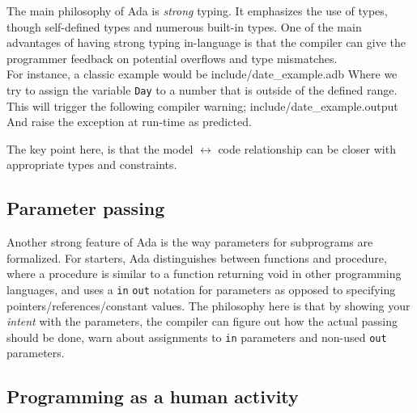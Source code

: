 \documentclass[10pt,a4paper]{article}
\newcommand{\code}[1]{\texttt{#1}}
\begin{document}
The main philosophy of Ada is \emph{strong} typing. It emphasizes the use of types, though self-defined types and numerous built-in types. One of the main advantages of having strong typing in-language is that the compiler can give the programmer feedback on potential overflows and type mismatches.\\

For instance, a classic example would be
 {include/date_example.adb}
Where we try to assign the variable \code{Day} to a number that is outside of the defined range. This will trigger the following compiler warning;
 {include/date_example.output}
And raise the exception at run-time as predicted.

The key point here, is that the model $\leftrightarrow$ code relationship can be closer with appropriate types and constraints.

\subsection{Parameter passing}
Another strong feature of Ada is the way parameters for subprograms are formalized. For starters, Ada distinguishes between functions and procedure, where a procedure is similar to a function returning void in other programming languages, and uses a \code{in} \code{out} notation for parameters as opposed to specifying pointers/references/constant values. The philosophy here is that by showing your \emph{intent} with the parameters, the compiler can figure out how the actual passing should be done, warn about assignments to \code{in} parameters and non-used \code{out} parameters.


\subsection{Programming as a human activity}

\appendix



\nocite{Chapman:2006:CCM:1151816.1151820}
\nocite{bishop2004teaching}
\nocite{Wikipedia:Defensive_programming}
\nocite{Wikipedia:OO_encapsulation}
\end{document}
